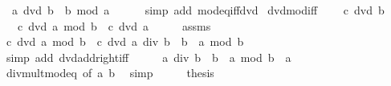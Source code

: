 \begin{isabellebody}
\ \ {\isachardoublequoteopen}a\ dvd\ b\ {\isasymlongleftrightarrow}\ b\ mod\ a\ {\isacharequal}{\kern0pt}\ {}{\isachardoublequoteclose}\isanewline
%
\isadelimproof
\ \ %
\endisadelimproof
%
\isatagproof
{}\isamarkupfalse%
\ {\isacharparenleft}{\kern0pt}simp\ add{\isacharcolon}{\kern0pt}\ mod{\isacharunderscore}{\kern0pt}eq{\isacharunderscore}{\kern0pt}{}{\isacharunderscore}{\kern0pt}iff{\isacharunderscore}{\kern0pt}dvd{\isacharparenright}{\kern0pt}%
\endisatagproof
{\isafoldproof}%
%
\isadelimproof
\isanewline
%
\endisadelimproof
\isanewline
{}\isamarkupfalse%
\ dvd{\isacharunderscore}{\kern0pt}mod{\isacharunderscore}{\kern0pt}iff{\isacharcolon}{\kern0pt}\ \isanewline
\ \ \ {\isachardoublequoteopen}c\ dvd\ b{\isachardoublequoteclose}\isanewline
\ \ \ {\isachardoublequoteopen}c\ dvd\ a\ mod\ b\ {\isasymlongleftrightarrow}\ c\ dvd\ a{\isachardoublequoteclose}\isanewline
%
\isadelimproof
%
\endisadelimproof
%
\isatagproof
{}\isamarkupfalse%
\ {\isacharminus}{\kern0pt}\isanewline
\ \ \isamarkupfalse%
\ assms\ \isamarkupfalse%
\ {\isachardoublequoteopen}{\isacharparenleft}{\kern0pt}c\ dvd\ a\ mod\ b{\isacharparenright}{\kern0pt}\ {\isasymlongleftrightarrow}\ {\isacharparenleft}{\kern0pt}c\ dvd\ {\isacharparenleft}{\kern0pt}{\isacharparenleft}{\kern0pt}a\ div\ b{\isacharparenright}{\kern0pt}\ {\isacharasterisk}{\kern0pt}\ b\ {\isacharplus}{\kern0pt}\ a\ mod\ b{\isacharparenright}{\kern0pt}{\isacharparenright}{\kern0pt}{\isachardoublequoteclose}\ \isanewline
\ \ \ \ \isamarkupfalse%
\ {\isacharparenleft}{\kern0pt}simp\ add{\isacharcolon}{\kern0pt}\ dvd{\isacharunderscore}{\kern0pt}add{\isacharunderscore}{\kern0pt}right{\isacharunderscore}{\kern0pt}iff{\isacharparenright}{\kern0pt}\isanewline
\ \ \isamarkupfalse%
\ \isamarkupfalse%
\ {\isachardoublequoteopen}{\isacharparenleft}{\kern0pt}a\ div\ b{\isacharparenright}{\kern0pt}\ {\isacharasterisk}{\kern0pt}\ b\ {\isacharplus}{\kern0pt}\ a\ mod\ b\ {\isacharequal}{\kern0pt}\ a{\isachardoublequoteclose}\isanewline
\ \ \ \ \isamarkupfalse%
\ div{\isacharunderscore}{\kern0pt}mult{\isacharunderscore}{\kern0pt}mod{\isacharunderscore}{\kern0pt}eq\ {\isacharbrackleft}{\kern0pt}of\ a\ b{\isacharbrackright}{\kern0pt}\ \isamarkupfalse%
\ simp\isanewline
\ \ \isamarkupfalse%
\ \isamarkupfalse%
\ {\isacharquery}{\kern0pt}thesis\ \isacommand{{\isachardot}{\kern0pt}}\isamarkupfalse%

\end{isabellebody}
